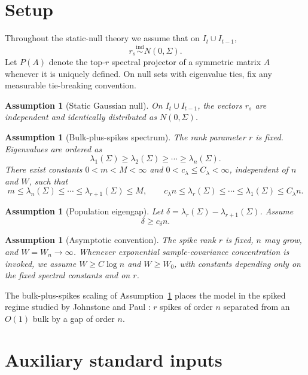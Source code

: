 \documentclass[11pt]{article}
\theoremstyle{tightplain}
\theoremstyle{tightdef}
\newtheorem{assumption}[theorem]{Assumption}
\begin{document}
\section{Setup}\label{sec:setup}

Throughout the static-null theory we assume that on $I_t\cup I_{t-1}$,
\[
r_s\stackrel{\mathrm{ind}}{\sim}N(0,\Sigma).
\]
Let $P(A)$ denote the top-$r$ spectral projector of a symmetric matrix $A$
whenever it is uniquely defined. On null sets with eigenvalue ties, fix any
measurable tie-breaking convention.

\begin{assumption}[Static Gaussian null]\label{ass:gaussian}
On $I_t\cup I_{t-1}$, the vectors $r_s$ are independent and identically
distributed as $N(0,\Sigma)$.
\end{assumption}

\begin{assumption}[Bulk-plus-spikes spectrum]\label{ass:bulkspike}
The rank parameter $r$ is fixed. Eigenvalues are ordered as
\[
\lambda_1(\Sigma)\ge\lambda_2(\Sigma)\ge\cdots\ge\lambda_n(\Sigma).
\]
There exist constants $0<m<M<\infty$ and $0<c_\lambda\le C_\lambda<\infty$,
independent of $n$ and $W$, such that
\[
m\le \lambda_n(\Sigma)\le\cdots\le\lambda_{r+1}(\Sigma)\le M,
\qquad
c_\lambda n\le \lambda_r(\Sigma)\le\cdots\le\lambda_1(\Sigma)\le C_\lambda n.
\]
\end{assumption}

\begin{assumption}[Population eigengap]\label{ass:gap}
Let $\delta=\lambda_r(\Sigma)-\lambda_{r+1}(\Sigma)$. Assume
\[
\delta\ge c_\delta n.
\]
\end{assumption}

\begin{assumption}[Asymptotic convention]\label{ass:asymptotic}
The spike rank $r$ is fixed, $n$ may grow, and $W=W_n\to\infty$. Whenever
exponential sample-covariance concentration is invoked, we assume
$W\ge C\log n$ and $W\ge W_0$, with constants depending only on the fixed
spectral constants and on $r$.
\end{assumption}

The bulk-plus-spikes scaling of Assumption~\ref{ass:bulkspike} places the model
in the spiked regime studied by Johnstone \cite{Johnstone2001} and Paul
\cite{Paul2007}: $r$ spikes of order $n$ separated from an $O(1)$ bulk by a gap
of order $n$.

\section{Auxiliary standard inputs}\label{sec:aux}
\end{document}
